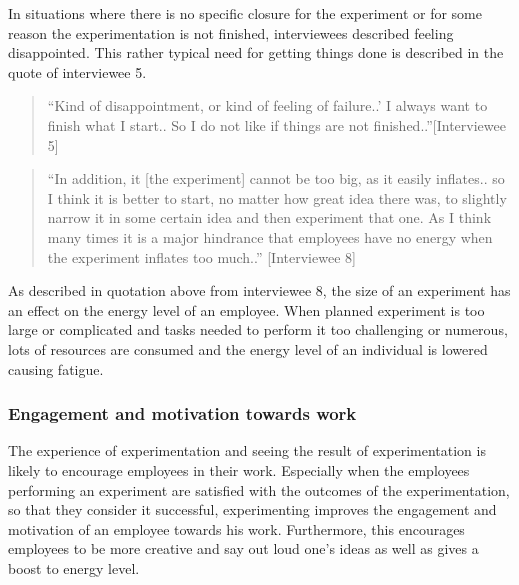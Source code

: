 In situations where there is no specific closure for the experiment or for some reason the experimentation is not finished, interviewees described feeling disappointed. This rather typical need for getting things done is described in the quote of interviewee 5.
 \begin{quote}
``Kind of disappointment, or kind of feeling of failure..' I always want to finish what I start.. So I do not like if things are not finished..''[Interviewee 5]
\end{quote}
\begin{quote}
``In addition, it [the experiment] cannot be too big, as it easily inflates.. so I think it is better to start, no matter how great idea there was, to slightly narrow it in some certain idea and then experiment that one. As I think many times it is a major hindrance that employees have no energy when the experiment inflates too much..'' [Interviewee 8]
\end{quote}
As described in quotation above from interviewee 8, the size of an experiment has an effect on the energy level of an employee. When planned experiment is too large or complicated and tasks needed to perform it too challenging or numerous, lots of resources are consumed and the energy level of an individual is lowered causing fatigue. 

\subsubsection{Engagement and motivation towards work}
The experience of experimentation and seeing the result of experimentation is likely to encourage employees in their work.  Especially when the employees performing an experiment are satisfied with the outcomes of the experimentation, so that they consider it successful, experimenting improves the engagement and motivation of an employee towards his work. Furthermore, this encourages employees to be more creative and say out loud one's ideas as well as gives a boost to energy level.


